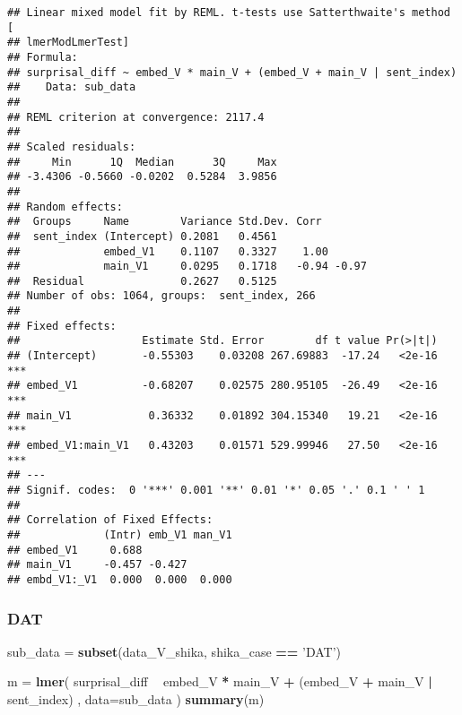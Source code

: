 \documentclass[]{ltjsarticle}
\newenvironment{Shaded}{\begin{snugshade}}{\end{snugshade}}
\newcommand{\KeywordTok}[1]{\textcolor[rgb]{0.13,0.29,0.53}{\textbf{#1}}}
\newcommand{\DataTypeTok}[1]{\textcolor[rgb]{0.13,0.29,0.53}{#1}}
\newcommand{\StringTok}[1]{\textcolor[rgb]{0.31,0.60,0.02}{#1}}
\newcommand{\OperatorTok}[1]{\textcolor[rgb]{0.81,0.36,0.00}{\textbf{#1}}}
\newcommand{\NormalTok}[1]{#1}
\begin{document}
\begin{verbatim}
## Linear mixed model fit by REML. t-tests use Satterthwaite's method [
## lmerModLmerTest]
## Formula: 
## surprisal_diff ~ embed_V * main_V + (embed_V + main_V | sent_index)
##    Data: sub_data
## 
## REML criterion at convergence: 2117.4
## 
## Scaled residuals: 
##     Min      1Q  Median      3Q     Max 
## -3.4306 -0.5660 -0.0202  0.5284  3.9856 
## 
## Random effects:
##  Groups     Name        Variance Std.Dev. Corr       
##  sent_index (Intercept) 0.2081   0.4561              
##             embed_V1    0.1107   0.3327    1.00      
##             main_V1     0.0295   0.1718   -0.94 -0.97
##  Residual               0.2627   0.5125              
## Number of obs: 1064, groups:  sent_index, 266
## 
## Fixed effects:
##                   Estimate Std. Error        df t value Pr(>|t|)    
## (Intercept)       -0.55303    0.03208 267.69883  -17.24   <2e-16 ***
## embed_V1          -0.68207    0.02575 280.95105  -26.49   <2e-16 ***
## main_V1            0.36332    0.01892 304.15340   19.21   <2e-16 ***
## embed_V1:main_V1   0.43203    0.01571 529.99946   27.50   <2e-16 ***
## ---
## Signif. codes:  0 '***' 0.001 '**' 0.01 '*' 0.05 '.' 0.1 ' ' 1
## 
## Correlation of Fixed Effects:
##             (Intr) emb_V1 man_V1
## embed_V1     0.688              
## main_V1     -0.457 -0.427       
## embd_V1:_V1  0.000  0.000  0.000
\end{verbatim}

\subsubsection{DAT}\label{dat-1}

\begin{Shaded}
\begin{Highlighting}[]
\NormalTok{sub_data =}\StringTok{ }\KeywordTok{subset}\NormalTok{(data_V_shika, shika_case }\OperatorTok{==}\StringTok{ 'DAT'}\NormalTok{)}

\NormalTok{m =}\StringTok{ }\KeywordTok{lmer}\NormalTok{(}
\NormalTok{        surprisal_diff}
            \OperatorTok{~}\StringTok{ }\NormalTok{embed_V }\OperatorTok{*}\StringTok{ }\NormalTok{main_V}
                \OperatorTok{+}\StringTok{ }\NormalTok{(embed_V }\OperatorTok{+}\StringTok{ }\NormalTok{main_V }\OperatorTok{|}\StringTok{ }\NormalTok{sent_index)}
\NormalTok{        ,}
        \DataTypeTok{data=}\NormalTok{sub_data}
\NormalTok{        )}
\KeywordTok{summary}\NormalTok{(m)}
\end{Highlighting}
\end{Shaded}
\end{document}
